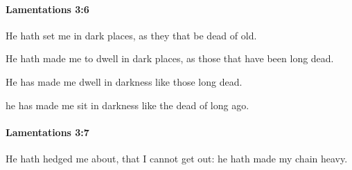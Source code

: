 		\paragraph{Lamentations 3:6} %
			\label{LAMENTATIONS-3-6}

			He hath set me in dark places, as they that be dead of old.

			\begin{versebox}
					\item[BHS] 
					\item[LXX] 
					\item[ASV] He hath made me to dwell in dark places, as those that have been long dead.
					\item[NIV] He has made me dwell in darkness like those long dead.
					\item[NRSV] he has made me sit in darkness like the dead of long ago.
			\end{versebox}

		\paragraph{Lamentations 3:7} %
			\label{LAMENTATIONS-3-7}

			He hath hedged me about, that I cannot get out: he hath made my chain heavy.

